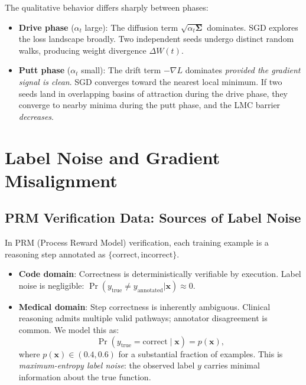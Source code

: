 \documentclass{article}
\newcommand{\bSigma}{\boldsymbol{\Sigma}}
\begin{document}
The qualitative behavior differs sharply between phases:
\begin{itemize}
\item \textbf{Drive phase} ($\alpha_t$ large): The diffusion term
      $\sqrt{\alpha_t \bSigma}$ dominates.  SGD explores the loss landscape
      broadly.  Two independent seeds undergo distinct random walks, producing
      weight divergence $\Delta W(t)$.
\item \textbf{Putt phase} ($\alpha_t$ small): The drift term $-\nabla L$
      dominates \emph{provided the gradient signal is clean}.  SGD converges
      toward the nearest local minimum.  If two seeds land in overlapping
      basins of attraction during the drive phase, they converge to nearby
      minima during the putt phase, and the LMC barrier \emph{decreases}.
\end{itemize}

\section{Label Noise and Gradient Misalignment}

\subsection{PRM Verification Data: Sources of Label Noise}

In PRM (Process Reward Model) verification, each training example is a
reasoning step annotated as $\{\text{correct}, \text{incorrect}\}$.

\begin{itemize}
\item \textbf{Code domain}: Correctness is deterministically verifiable by
      execution.  Label noise is negligible: $\Pr(y_{\text{true}} \neq y_{\text{annotated}} | \mathbf{x}) \approx 0$.
\item \textbf{Medical domain}: Step correctness is inherently ambiguous.
      Clinical reasoning admits multiple valid pathways; annotator
      disagreement is common.  We model this as:
      \begin{equation}
      \Pr(y_{\text{true}} = \text{correct} \mid \mathbf{x}) = p(\mathbf{x}),
      \end{equation}
      where $p(\mathbf{x}) \in (0.4, 0.6)$ for a substantial fraction of
      examples.  This is \emph{maximum-entropy label noise}: the observed
      label $y$ carries minimal information about the true function.
\end{itemize}
\end{document}
